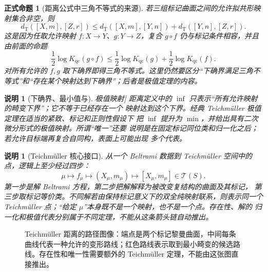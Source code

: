 \documentclass[UTF8,fontset=none,a4paper,11pt]{ctexart}
\theoremstyle{foundation-definition}
\theoremstyle{foundation-theorem}
\theoremstyle{foundation-proposition}
\newtheorem{proposition}[definition]{正式命题}
\theoremstyle{foundation-example}
\theoremstyle{foundation-remark}
\newtheorem{remark}[definition]{说明}
\theoremstyle{foundation-theorem}
\newcommand{\T}{\mathcal T}
\newcommand{\term}[2]{\hyperref[#1]{#2}}
\begin{document}
\begin{proposition}[距离公式中三角不等式的来源]
若三组标记曲面之间的允许拟共形映射集合非空，则
\[
  d_{\mathrm T}([X,m],[Z,r])
  \leq d_{\mathrm T}([X,m],[Y,n])
     +d_{\mathrm T}([Y,n],[Z,r]).
\]
这是因为任取允许映射 \(f:X\to Y\)、\(g:Y\to Z\)，复合 \(g\circ f\) 仍与标记条件相容，并且由前面的命题
\[
  \frac12\log K_{\mathrm{qc}}(g\circ f)
  \leq \frac12\log K_{\mathrm{qc}}(g)+\frac12\log K_{\mathrm{qc}}(f).
\]
对所有允许的 \(f,g\) 取下确界即得三角不等式。这里仍然要区分“下确界满足三角不等式”和“存在某个映射达到下确界”；后者是极值定理的内容。
\end{proposition}

\begin{remark}[下确界、最小值与\term{def:extremal-map}{极值映射}]
距离定义中的 \(\inf\) 只表示“所有允许映射的畸变下界”；它不等于已经存在一个
映射达到这个下界。经典 Teichmüller 极值定理在适当的紧致、标记和正则性假设下
把 \(\inf\) 提升为 \(\min\)，并给出具有二次微分形式的极值映射。所谓“唯一”还要
说明是在固定标记同位类和归一化之后；若允许目标端再复合自同构，表面上可能出现
多个代表。
\end{remark}

\begin{remark}[Teichmüller 核心接口]
从一个 Beltrami 数据到 Teichmüller 空间中的点，逻辑上至少经过四步：
\[
\mu
\longmapsto f_\mu
\longmapsto (X_\mu,m_\mu)
\longmapsto [X_\mu,m_\mu]\in\T(S).
\]
第一步是解 Beltrami 方程，第二步把解解释为被改变复结构的曲面及其标记，
第三步取标记等价类。不同解若由保持标记意义下的双全纯映射联系，则表示同一个
Teichmüller 点；“给定 \(\mu\)”本身既不是一个映射，也不是一个点。存在性、解的
归一化和极值代表分别属于不同定理，不能从这条箭头链自动推出。
\end{remark}

\begin{figure}[htbp]
\centering
{}
\caption{Teichmüller 距离的路径图像：端点是两个标记黎曼曲面，中间每条曲线代表一种允许的变形路线；红色路线表示取到最小畸变的候选路线。存在性和唯一性需要额外的 Teichmüller 定理，不能由这张图直接推出。}
\label{fig:teichmuller-distance}
\end{figure}
\end{document}
